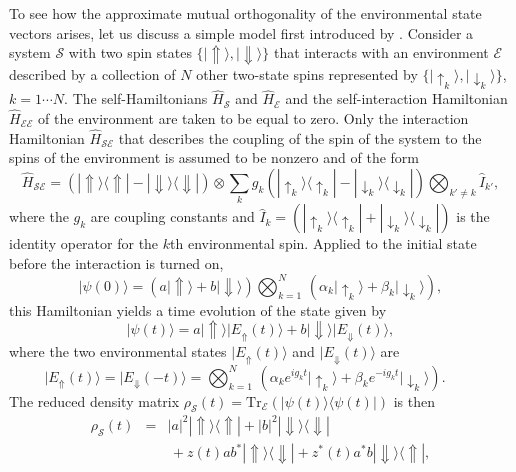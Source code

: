 \documentclass[twocolumn,rmp,aps,amsmath,amsfonts,noshowkeys,noshowpacs]{revtex4}
\newcommand{\ket}[1]{\ensuremath{|{#1\rangle}}}
\newcommand{\bra}[1]{\ensuremath{{\langle #1}|}}
\newcommand{\ketbra}[2]{\ensuremath{|{#1 \rangle}{\langle #2}|}}
\begin{document}
To see how the approximate mutual orthogonality of the environmental
state vectors arises, let us discuss a simple model first introduced
by \citet{Zurek:1982:tv}.  Consider a system $\mathcal{S}$ with two
spin states $\{ \ket{\Uparrow}, \ket{\Downarrow} \}$ that interacts
with an environment $\mathcal{E}$ described by a collection of $N$
other two-state spins represented by $\{ \ket{\uparrow_k},
\ket{\downarrow_k} \}$, $k=1\cdots N$. The self-Hamiltonians
$\widehat{H}_{\mathcal{S}}$ and $\widehat{H}_{\mathcal{E}}$ and the
self-interaction Hamiltonian $\widehat{H}_\mathcal{EE}$ of the
environment are taken to be equal to zero.  Only the interaction
Hamiltonian $\widehat{H}_\mathcal{SE}$ that describes the coupling of
the spin of the system to the spins of the environment is assumed to
be nonzero and of the form
%
\begin{equation} 
\widehat{H}_\mathcal{SE} = ( \ketbra{\Uparrow}{\Uparrow} -
\ketbra{\Downarrow}{\Downarrow} ) \otimes \sum_k g_k (
\ketbra{\uparrow_k}{\uparrow_k} - \ketbra{\downarrow_k}{\downarrow_k} )
\bigotimes_{k' \not= k}  \widehat{I}_{k'}, 
\end{equation}
%
where the $g_k$ are coupling constants and $\widehat{I}_{k} =
(\ketbra{\uparrow_k}{\uparrow_k} +
\ketbra{\downarrow_k}{\downarrow_k})$ is the identity operator for the
$k$th environmental spin. Applied to the initial state before the
interaction is turned on,
%
\begin{equation}
\ket{\psi(0)} = ( a\ket{\Uparrow} + b\ket{\Downarrow} ) \bigotimes_{k=1}^N
\, ( \alpha_k \ket{\uparrow_k} + \beta_k \ket{\downarrow_k} ),
\end{equation}
%
this Hamiltonian yields a time evolution of the state given by
%
\begin{equation} 
\ket{\psi(t)} = a\ket{\Uparrow}\ket{E_{\Uparrow}(t)} +
b\ket{\Downarrow}\ket{E_{\Downarrow}(t)},
\end{equation}
%
where the two environmental states $\ket{E_{\Uparrow}(t)}$ and
$\ket{E_{\Downarrow}(t)}$ are
%
\begin{equation} 
\ket{E_{\Uparrow}(t)} = \ket{E_{\Downarrow}(-t)} 
= \bigotimes_{k=1}^N\,
 ( \alpha_k e^{ig_kt}\ket{\uparrow_k} + \beta_k
e^{-ig_kt}\ket{\downarrow_k} ). \phantom{xxxx} 
\end{equation}
%
The reduced density matrix $\rho_{\mathcal{S}}(t)=\text{Tr}_{\mathcal{E}} (\ket{\psi(t)}
\bra{\psi(t)})$ is then
%
\begin{eqnarray}
\rho_{\mathcal{S}}(t) &=& |a|^2
\ketbra{\Uparrow}{\Uparrow} + |b|^2 \ketbra{\Downarrow}{\Downarrow}
\nonumber \\ && \, + z(t)ab^*\ketbra{\Uparrow}{\Downarrow} +
z^*(t)a^*b\ketbra{\Downarrow}{\Uparrow},
\end{eqnarray}
\end{document}
